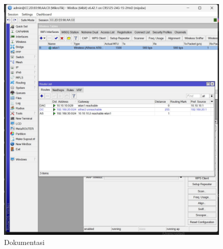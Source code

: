     \begin{figure}[H]
        \centering
        \includegraphics[width=0.5\linewidth]{P1/img/25.jpeg}
        \caption{Dokumentasi}
        \label{fig:gambar1}
    \end{figure}

